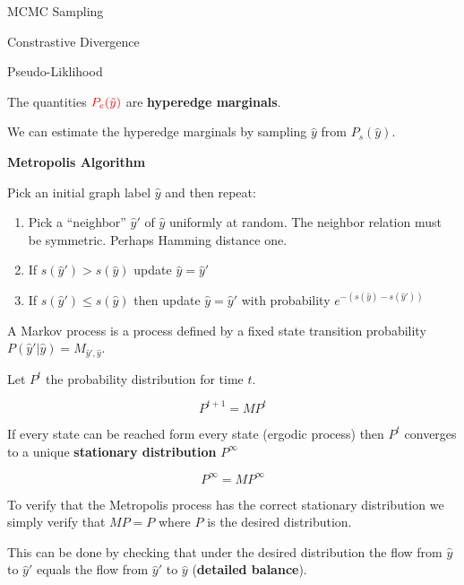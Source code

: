 {

MCMC Sampling

\vfill
Constrastive Divergence

\vfill
Pseudo-Liklihood


The quantities ${\color{red} P_e(\tilde{y})}$ are {\bf hyperedge marginals}.

\vfill
We can estimate the hyperedge marginals by sampling $\hat{y}$ from $P_s(\hat{y})$.


\centerline{\bf Metropolis Algorithm}

\vfill
Pick an initial graph label $\hat{y}$ and then repeat:

\begin{enumerate}
\item Pick a ``neighbor'' $\hat{y}'$ of $\hat{y}$ uniformly at random.  The neighbor relation must be symmetric.  Perhaps Hamming distance one.

  \vfill
\item If $s(\hat{y}') > s(\hat{y})$ update $\hat{y} = \hat{y}'$

  \vfill
\item If $s(\hat{y}') \leq s(\hat{y})$ then update $\hat{y} = \hat{y}'$ with probability $e^{-(s(\hat{y}) - s(\hat{y}'))}$
  \end{enumerate}  


A Markov process is a process defined by a fixed state transition probability $P(\hat{y}'|\hat{y}) = M_{\hat{y}',\hat{y}}$.

\vfill
Let $P^t$ the probability distribution for time $t$.

\vfill
$$P^{t+1} = MP^t$$

\vfill
If every state can be reached form every state (ergodic process) then $P^t$ converges to a unique {\bf stationary distribution} $P^\infty$

\vfill
$$P^\infty = MP^\infty$$


To verify that the Metropolis process has the correct stationary distribution we simply verify that $MP = P$ where $P$
is the desired distribution.

\vfill
This can be done by checking that under the desired distribution the flow from $\hat{y}$ to $\hat{y}'$
equals the flow from $\hat{y}'$ to $\hat{y}$ ({\bf detailed balance}).

}
